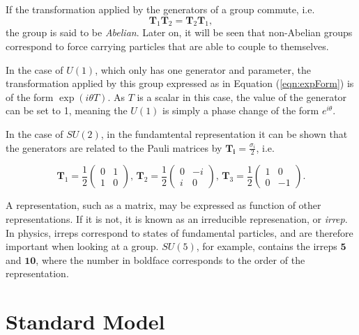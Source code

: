 \documentclass{article}
\begin{document}
If the transformation applied by the generators of a group commute, i.e.
\begin{equation}
\bm{T}_1\bm{T}_2 = \bm{T}_2\bm{T}_1,
\end{equation}
the group is said to be \textit{Abelian}. Later on, it will be seen that non-Abelian groups correspond to force carrying particles that are able to couple to themselves.

In the case of $U(1)$, which only has one generator and parameter, the transformation applied by this group expressed as in Equation (\ref{eqn:expForm}) is of the form $\exp(i\theta T)$. As $T$ is a scalar in this case, the value of the generator can be set to 1, meaning the $U(1)$ is simply a phase change of the form $e^{i\theta}$.

In the case of $SU(2)$, in the fundamtental representation it can be shown that the generators are related to the Pauli matrices by $\bm{T_i} = \frac{\sigma_i}{2}$, i.e. 

\begin{equation}
\label{eqn:SU2Gen}
\bm{T}_1 = \frac{1}{2}\left(\begin{matrix}
0 & 1 \\
1 & 0
\end{matrix}\right),\, \bm{T}_2 = \frac{1}{2} \left(
\begin{matrix}
0 & -i \\
i & 0
\end{matrix}\right),\,\bm{T}_3 = \frac{1}{2}\left(
\begin{matrix}
1 & 0 \\
0 & -1
\end{matrix}\right).
\end{equation}

A representation, such as a matrix, may be expressed as function of other representations. If it is not, it is known as an irreducible represenation, or \textit{irrep}. In physics, irreps correspond to states of fundamental particles, and are therefore important when looking at a group. $SU(5)$, for example, contains the irreps $\bm{5}$ and $\bm{10}$, where the number in boldface corresponds to the order of the representation.

\section{Standard Model}%
\label{sec:SM}
\end{document}
